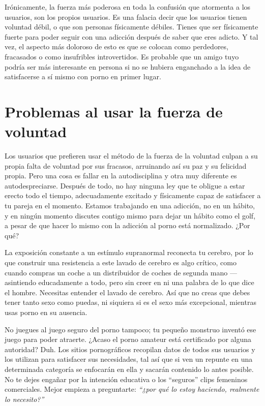 \documentclass[
  spanish,
  openany]{book}
\begin{document}
Irónicamente, la fuerza más poderosa en toda la confusión que atormenta a los usuarios, son los propios usuarios. Es una falacia decir que los usuarios tienen voluntad débil, o que son personas físicamente débiles. Tienes que ser físicamente fuerte para poder seguir con una adicción después de saber que eres adicto. Y tal vez, el aspecto más doloroso de esto es que se colocan como perdedores, fracasados o como insufribles introvertidos. Es probable que un amigo tuyo podría ser más interesante en persona si no se hubiera enganchado a la idea de satisfacerse a sí mismo con porno en primer lugar.

\hypertarget{problemas-al-usar-la-fuerza-de-voluntad}{%
\section{Problemas al usar la fuerza de voluntad}\label{problemas-al-usar-la-fuerza-de-voluntad}}

Los usuarios que prefieren usar el método de la fuerza de la voluntad culpan a su propia falta de voluntad por sus fracasos, arruinando así su paz y su felicidad propia. Pero una cosa es fallar en la autodisciplina y otra muy diferente es autodespreciarse. Después de todo, no hay ninguna ley que te obligue a estar erecto todo el tiempo, adecuadamente excitado y físicamente capaz de satisfacer a tu pareja en el momento. Estamos trabajando en una adicción, no en un hábito, y en ningún momento discutes contigo mismo para dejar un hábito como el golf, a pesar de que hacer lo mismo con la adicción al porno está normalizado. ¿Por qué?

La exposición constante a un estímulo supranormal reconecta tu cerebro, por lo que construir una resistencia a este lavado de cerebro es algo crítico, como cuando compras un coche a un distribuidor de coches de segunda mano --- asintiendo educadamente a todo, pero sin creer en ni una palabra de lo que dice el hombre. Necesitas entender el lavado de cerebro. Así que no creas que debes tener tanto sexo como puedas, ni siquiera si es el sexo más excepcional, mientras usas porno en su ausencia.

No juegues al juego seguro del porno tampoco; tu pequeño monstruo inventó ese juego para poder atraerte. ¿Acaso el porno amateur está certificado por alguna autoridad? Duh. Los sitios pornográficos recopilan datos de todos sus usuarios y los utilizan para satisfacer sus necesidades, tal así que si ven un repunte en una determinada categoría se enfocarán en ella y sacarán contenido lo antes posible. No te dejes engañar por la intención educativa o los ``seguros'' clips femeninos comerciales. Mejor empieza a preguntarte: \emph{``¿por qué lo estoy haciendo, realmente lo necesito?''}
\end{document}
